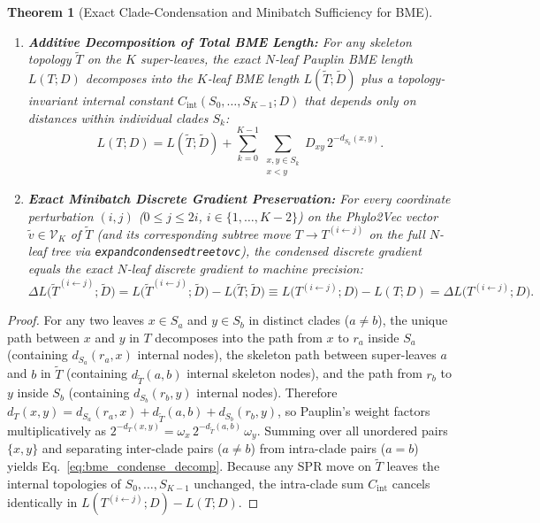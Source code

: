 \documentclass[11pt,a4paper]{article}
\makeatletter
\DeclareRobustCommand{\_}{\ifmmode\nfss@text{\textunderscore}\else\textunderscore\allowbreak\fi}
\newtheorem{theorem}{Theorem}[section]
\theoremstyle{definition}
\makeatother
\begin{document}
\begin{theorem}[Exact Clade-Condensation and Minibatch Sufficiency for BME]
\begin{enumerate}
    \item \textbf{Additive Decomposition of Total BME Length:} For any skeleton topology $\widetilde{T}$ on the $K$ super-leaves, the exact $N$-leaf Pauplin BME length $L(T; D)$ decomposes into the $K$-leaf BME length $L(\widetilde{T}; \widetilde{D})$ plus a topology-invariant internal constant $C_{\text{int}}(S_0, \dots, S_{K-1}; D)$ that depends only on distances within individual clades $S_k$:
    \begin{equation}
    L(T; D) = L(\widetilde{T}; \widetilde{D}) + \sum_{k=0}^{K-1} \sum_{\substack{x, y \in S_k \\ x < y}} D_{xy} \, 2^{-d_{S_k}(x, y)}.
    \label{eq:bme_condense_decomp}
    \end{equation}
    \item \textbf{Exact Minibatch Discrete Gradient Preservation:} For every coordinate perturbation $(i, j)$ ($0 \le j \le 2i$, $i \in \{1, \dots, K-2\}$) on the Phylo2Vec vector $\widetilde{v} \in \mathcal{V}_K$ of $\widetilde{T}$ (and its corresponding subtree move $T \to T^{(i \leftarrow j)}$ on the full $N$-leaf tree via \texttt{expand\_condensed\_tree\_to\_v\_c}), the condensed discrete gradient equals the exact $N$-leaf discrete gradient to machine precision:
    \begin{equation}
    \Delta L\big(\widetilde{T}^{(i \leftarrow j)}; \widetilde{D}\big) = L\big(\widetilde{T}^{(i \leftarrow j)}; \widetilde{D}\big) - L\big(\widetilde{T}; \widetilde{D}\big) \equiv L\big(T^{(i \leftarrow j)}; D\big) - L(T; D) = \Delta L\big(T^{(i \leftarrow j)}; D\big).
    \end{equation}
\end{enumerate}
\end{theorem}
\begin{proof}
For any two leaves $x \in S_a$ and $y \in S_b$ in distinct clades ($a \neq b$), the unique path between $x$ and $y$ in $T$ decomposes into the path from $x$ to $r_a$ inside $S_a$ (containing $d_{S_a}(r_a, x)$ internal nodes), the skeleton path between super-leaves $a$ and $b$ in $\widetilde{T}$ (containing $d_{\widetilde{T}}(a, b)$ internal skeleton nodes), and the path from $r_b$ to $y$ inside $S_b$ (containing $d_{S_b}(r_b, y)$ internal nodes). Therefore $d_T(x, y) = d_{S_a}(r_a, x) + d_{\widetilde{T}}(a, b) + d_{S_b}(r_b, y)$, so Pauplin's weight factors multiplicatively as $2^{-d_T(x,y)} = \omega_x \, 2^{-d_{\widetilde{T}}(a,b)} \, \omega_y$. Summing over all unordered pairs $\{x, y\}$ and separating inter-clade pairs ($a \neq b$) from intra-clade pairs ($a = b$) yields Eq.~\eqref{eq:bme_condense_decomp}. Because any SPR move on $\widetilde{T}$ leaves the internal topologies of $S_0, \dots, S_{K-1}$ unchanged, the intra-clade sum $C_{\text{int}}$ cancels identically in $L(T^{(i \leftarrow j)}; D) - L(T; D)$.
\end{proof}
\end{document}
